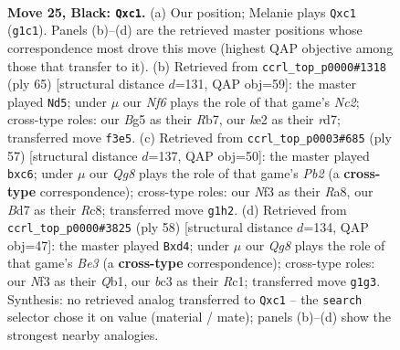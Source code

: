 \documentclass[11pt]{article}
\begin{document}
\clearpage

\begin{figure}[p]\centering
\begin{subfigure}{0.46\textwidth}\centering
\resizebox{\linewidth}{!}{%
\newchessgame
\chessboard[
  setfen={r3r3/1ppb2kp/5p2/p2p2b1/6P1/NPB1Pn2/P3KP2/RNR3q1 b - - 3 25},
  showmover=false,
  pgfstyle=straightmove, color=movearrow, markmove={g1-c1}
]}
\caption{}
\end{subfigure}\hfill
\begin{subfigure}{0.46\textwidth}\centering
\resizebox{\linewidth}{!}{%
\newchessgame
\chessboard[
  setfen={1r4k1/1rnRb3/pBn1p3/2P1P1pp/N5P1/1R3N1P/P5K1/8 b - - 0 33},
  showmover=false,
  pgfstyle=straightmove, color=movearrow, markmove={c7-d5}
]}
\caption{}
\end{subfigure}
\\[4pt]
\begin{subfigure}{0.46\textwidth}\centering
\resizebox{\linewidth}{!}{%
\newchessgame
\chessboard[
  setfen={r1r3k1/1p1nbpp1/1BP5/P7/2NN2b1/7p/4P2P/2RR2K1 b - - 0 29},
  showmover=false,
  pgfstyle=straightmove, color=movearrow, markmove={b7-c6}
]}
\caption{}
\end{subfigure}\hfill
\begin{subfigure}{0.46\textwidth}\centering
\resizebox{\linewidth}{!}{%
\newchessgame
\chessboard[
  setfen={7r/1pbk1p1p/1r2nPp1/pNp5/3n4/4B3/P5PP/1QR4K w - - 6 30},
  showmover=false,
  pgfstyle=straightmove, color=movearrow, markmove={e3-d4}
]}
\caption{}
\end{subfigure}
\caption{\textbf{Move 25, Black: \texttt{Qxc1}.} (a) Our position; Melanie plays \texttt{Qxc1} (\texttt{g1c1}). Panels (b)--(d) are the retrieved master positions whose correspondence most drove this move (highest QAP objective among those that transfer to it). (b) Retrieved from \texttt{ccrl\_top\_p0000\#1318} (ply 65) [structural distance $d$=131, QAP obj=59]: the master played \texttt{Nd5}; under $\mu$ our \emph{Nf6} plays the role of that game's \emph{Nc2}; cross-type roles: our \emph{B}g5 as their \emph{R}b7, our \emph{k}e2 as their \emph{r}d7; transferred move \texttt{f3e5}. (c) Retrieved from \texttt{ccrl\_top\_p0003\#685} (ply 57) [structural distance $d$=137, QAP obj=50]: the master played \texttt{bxc6}; under $\mu$ our \emph{Qg8} plays the role of that game's \emph{Pb2} (a \textbf{cross-type} correspondence); cross-type roles: our \emph{N}f3 as their \emph{R}a8, our \emph{B}d7 as their \emph{R}c8; transferred move \texttt{g1h2}. (d) Retrieved from \texttt{ccrl\_top\_p0000\#3825} (ply 58) [structural distance $d$=134, QAP obj=47]: the master played \texttt{Bxd4}; under $\mu$ our \emph{Qg8} plays the role of that game's \emph{Be3} (a \textbf{cross-type} correspondence); cross-type roles: our \emph{N}f3 as their \emph{Q}b1, our \emph{b}c3 as their \emph{R}c1; transferred move \texttt{g1g3}. Synthesis: no retrieved analog transferred to \texttt{Qxc1} -- the \texttt{search} selector chose it on value (material / mate); panels (b)--(d) show the strongest nearby analogies.}
\label{fig:thought-m49}
\end{figure}
\end{document}
